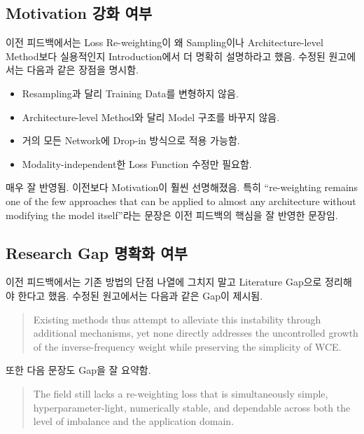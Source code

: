 \documentclass[11pt,a4paper]{article}
\begin{document}
\subsection{Motivation 강화 여부}

이전 피드백에서는 Loss Re-weighting이 왜 Sampling이나 Architecture-level Method보다 실용적인지 Introduction에서 더 명확히 설명하라고 했음. 수정된 원고에서는 다음과 같은 장점을 명시함.

\begin{itemize}
\item Resampling과 달리 Training Data를 변형하지 않음.
\item Architecture-level Method와 달리 Model 구조를 바꾸지 않음.
\item 거의 모든 Network에 Drop-in 방식으로 적용 가능함.
\item Modality-independent한 Loss Function 수정만 필요함.
\end{itemize}

\begin{tcolorbox}[title=반영 평가]
매우 잘 반영됨. 이전보다 Motivation이 훨씬 선명해졌음. 특히 ``re-weighting remains one of the few approaches that can be applied to almost any architecture without modifying the model itself''라는 문장은 이전 피드백의 핵심을 잘 반영한 문장임.
\end{tcolorbox}

\subsection{Research Gap 명확화 여부}

이전 피드백에서는 기존 방법의 단점 나열에 그치지 말고 Literature Gap으로 정리해야 한다고 했음. 수정된 원고에서는 다음과 같은 Gap이 제시됨.

\begin{quote}
Existing methods thus attempt to alleviate this instability through additional mechanisms, yet none directly addresses the uncontrolled growth of the inverse-frequency weight while preserving the simplicity of WCE.
\end{quote}

또한 다음 문장도 Gap을 잘 요약함.

\begin{quote}
The field still lacks a re-weighting loss that is simultaneously simple, hyperparameter-light, numerically stable, and dependable across both the level of imbalance and the application domain.
\end{quote}
\end{document}
